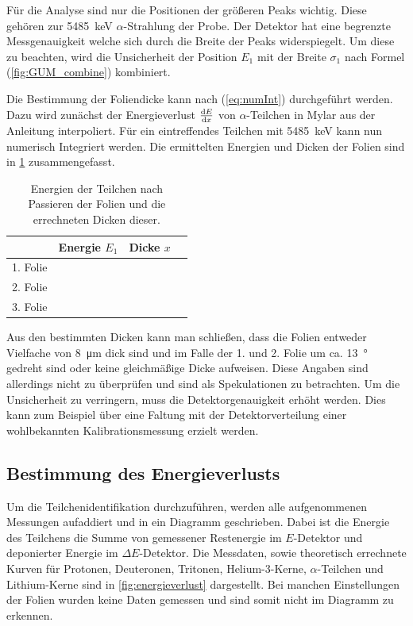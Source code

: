 Für die Analyse sind nur die Positionen der größeren Peaks wichtig.
Diese gehören zur \SI{5485}{\kilo\electronvolt} $\alpha$-Strahlung der Probe.
Der Detektor hat eine begrenzte Messgenauigkeit welche sich durch die Breite der Peaks widerspiegelt.
Um diese zu beachten, wird die Unsicherheit der Position $E_1$ mit der Breite $\sigma_1$ nach Formel (\ref{fig:GUM_combine}) kombiniert.

Die Bestimmung der Foliendicke kann nach (\ref{eq:numInt}) durchgeführt werden.
Dazu wird zunächst der Energieverlust $\dv{E}{x}$ von $\alpha$-Teilchen in Mylar aus der Anleitung interpoliert.
Für ein eintreffendes Teilchen mit \SI{5485}{\kilo\electronvolt} kann nun numerisch Integriert werden.
Die ermittelten Energien und Dicken der Folien sind in \cref{tab:dicken} zusammengefasst.

\begin{table}[ht]
	\centering
	\caption{Energien der Teilchen nach Passieren der Folien und die errechneten Dicken dieser.} 
	\label{tab:dicken}
	\begin{tabular}{c|ccc}
		\toprule
		         &          Energie $E_1$          &           Dicke $x$           &  \\ \midrule
		1. Folie &  &  &  \\
		2. Folie &  &  &  \\
		3. Folie &  &  &  \\ \bottomrule
	\end{tabular}
\end{table}

Aus den bestimmten Dicken kann man schließen, dass die Folien entweder Vielfache von \SI{8}{\micro\meter} dick sind und im Falle der 1. und 2. Folie um ca. \SI{13}{\degree} gedreht sind oder keine gleichmäßige Dicke aufweisen.
Diese Angaben sind allerdings nicht zu überprüfen und sind als Spekulationen zu betrachten.
Um die Unsicherheit zu verringern, muss die Detektorgenauigkeit erhöht werden.
Dies kann zum Beispiel über eine Faltung mit der Detektorverteilung einer wohlbekannten Kalibrationsmessung erzielt werden.

\subsection{Bestimmung des Energieverlusts}

Um die Teilchenidentifikation durchzuführen, werden alle aufgenommenen Messungen aufaddiert und in ein Diagramm geschrieben.
Dabei ist die Energie des Teilchens die Summe von gemessener Restenergie im $E$-Detektor und deponierter Energie im $\Delta E$-Detektor.
Die Messdaten, sowie theoretisch errechnete Kurven für Protonen, Deuteronen, Tritonen, Helium-3-Kerne, $\alpha$-Teilchen und Lithium-Kerne sind in \cref{fig:energieverlust} dargestellt.
Bei manchen Einstellungen der Folien wurden keine Daten gemessen und sind somit nicht im Diagramm zu erkennen.

